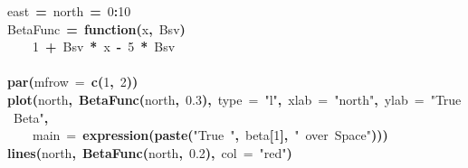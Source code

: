 \documentclass{article}
\makeatletter
\newcommand{\hlnumber}[1]{\textcolor[rgb]{0,0,0}{#1}}%
\newcommand{\hlfunctioncall}[1]{\textcolor[rgb]{0.501960784313725,0,0.329411764705882}{\textbf{#1}}}%
\newcommand{\hlstring}[1]{\textcolor[rgb]{0.6,0.6,1}{#1}}%
\newcommand{\hlkeyword}[1]{\textcolor[rgb]{0,0,0}{\textbf{#1}}}%
\newcommand{\hlargument}[1]{\textcolor[rgb]{0.690196078431373,0.250980392156863,0.0196078431372549}{#1}}%
\newcommand{\hlformalargs}[1]{\textcolor[rgb]{0.690196078431373,0.250980392156863,0.0196078431372549}{#1}}%
\newcommand{\hlassignement}[1]{\textcolor[rgb]{0,0,0}{\textbf{#1}}}%
\newcommand{\hlsymbol}[1]{\textcolor[rgb]{0,0,0}{#1}}%
\newcommand{\hlstd}[1]{\textcolor[rgb]{0,0,0}{#1}}%
\newenvironment{kframe}{%
 \def\FrameCommand##1{\hskip\@totalleftmargin \hskip-\fboxsep
 \colorbox{shadecolor}{##1}\hskip-\fboxsep
     \hskip-\linewidth \hskip-\@totalleftmargin \hskip\columnwidth}%
 \MakeFramed {\advance\hsize-\width
   \@totalleftmargin\z@ \linewidth\hsize
   \@setminipage}}%
 {\par\unskip\endMakeFramed}
\newenvironment{knitrout}{}{} %
\makeatother
\begin{document}
\begin{knitrout}
\color{fgcolor}\begin{kframe}
\begin{flushleft}
\ttfamily\noindent
\hlsymbol{east}{\ }\hlassignement{=}{\ }\hlsymbol{north}{\ }\hlassignement{=}{\ }\hlnumber{0}\hlkeyword{:}\hlnumber{10}\hspace*{\fill}\\
\hlstd{}\hlsymbol{BetaFunc}{\ }\hlassignement{=}{\ }\hlkeyword{function}\hlkeyword{(}\hlformalargs{x}\hlkeyword{,}{\ }\hlformalargs{Bsv}\hlkeyword{)}{\ }\hlkeyword{\usebox{\hlnormalsizeboxopenbrace}}\hspace*{\fill}\\
\hlstd{}{\ }{\ }{\ }{\ }\hlnumber{1}{\ }\hlkeyword{+}{\ }\hlsymbol{Bsv}{\ }\hlkeyword{*}{\ }\hlsymbol{x}{\ }\hlkeyword{-}{\ }\hlnumber{5}{\ }\hlkeyword{*}{\ }\hlsymbol{Bsv}\hspace*{\fill}\\
\hlstd{}\hlkeyword{\usebox{\hlnormalsizeboxclosebrace}}\hspace*{\fill}\\
\hlstd{}\hlfunctioncall{par}\hlkeyword{(}\hlargument{mfrow}{\ }\hlargument{=}{\ }\hlfunctioncall{c}\hlkeyword{(}\hlnumber{1}\hlkeyword{,}{\ }\hlnumber{2}\hlkeyword{)}\hlkeyword{)}\hspace*{\fill}\\
\hlstd{}\hlfunctioncall{plot}\hlkeyword{(}\hlsymbol{north}\hlkeyword{,}{\ }\hlfunctioncall{BetaFunc}\hlkeyword{(}\hlsymbol{north}\hlkeyword{,}{\ }\hlnumber{0.3}\hlkeyword{)}\hlkeyword{,}{\ }\hlargument{type}{\ }\hlargument{=}{\ }\hlstring{"{}l"{}}\hlkeyword{,}{\ }\hlargument{xlab}{\ }\hlargument{=}{\ }\hlstring{"{}north"{}}\hlkeyword{,}{\ }\hlargument{ylab}{\ }\hlargument{=}{\ }\hlstring{"{}True{\ }Beta"{}}\hlkeyword{,}\hspace*{\fill}\\
\hlstd{}{\ }{\ }{\ }{\ }\hlargument{main}{\ }\hlargument{=}{\ }\hlfunctioncall{expression}\hlkeyword{(}\hlfunctioncall{paste}\hlkeyword{(}\hlstring{"{}True{\ }"{}}\hlkeyword{,}{\ }\hlsymbol{beta}\hlkeyword{[}\hlnumber{1}\hlkeyword{]}\hlkeyword{,}{\ }\hlstring{"{}{\ }over{\ }Space"{}}\hlkeyword{)}\hlkeyword{)}\hlkeyword{)}\hspace*{\fill}\\
\hlstd{}\hlfunctioncall{lines}\hlkeyword{(}\hlsymbol{north}\hlkeyword{,}{\ }\hlfunctioncall{BetaFunc}\hlkeyword{(}\hlsymbol{north}\hlkeyword{,}{\ }\hlnumber{0.2}\hlkeyword{)}\hlkeyword{,}{\ }\hlargument{col}{\ }\hlargument{=}{\ }\hlstring{"{}red"{}}\hlkeyword{)}\hspace*{\fill}\\

\end{flushleft}
\end{kframe}
\end{knitrout}
\end{document}
